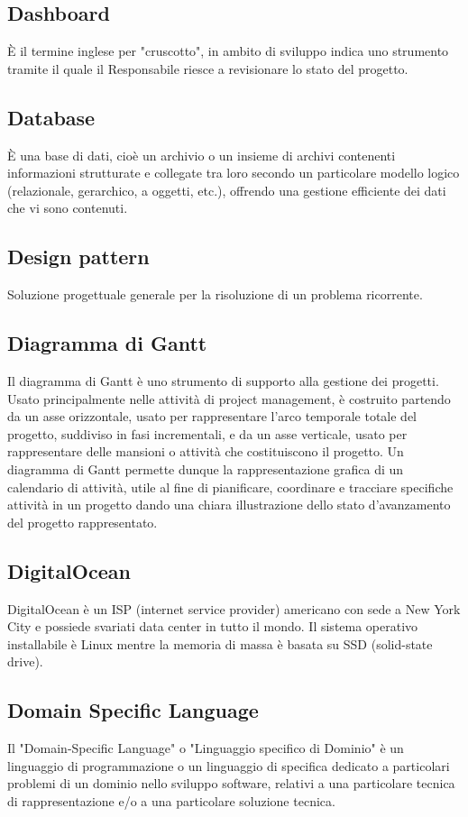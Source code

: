 \subsection*{Dashboard}
È il termine inglese per "cruscotto", in ambito di sviluppo indica uno strumento
tramite il quale il Responsabile riesce a revisionare lo stato del progetto.

\subsection*{Database}
È una base di dati, cioè un archivio o un insieme di archivi contenenti informazioni
strutturate e collegate tra loro secondo un particolare modello logico (relazionale, gerarchico,
a oggetti, etc.), offrendo una gestione efficiente dei dati che vi sono contenuti.

\subsection*{Design pattern}
Soluzione progettuale generale per la risoluzione di un problema ricorrente.

\subsection*{Diagramma di Gantt}
Il diagramma di Gantt è uno strumento di supporto alla gestione dei
progetti. Usato principalmente nelle attività di project management, è costruito partendo da
un asse orizzontale, usato per rappresentare l’arco temporale totale del progetto, suddiviso
in fasi incrementali, e da un asse verticale, usato per rappresentare delle mansioni o attività
che costituiscono il progetto. Un diagramma di Gantt permette dunque la rappresentazione
grafica di un calendario di attività, utile al fine di pianificare, coordinare e tracciare specifiche
attività in un progetto dando una chiara illustrazione dello stato d’avanzamento del progetto
rappresentato.

\subsection*{DigitalOcean}
DigitalOcean è un ISP (internet service provider) americano con sede a New York City e possiede svariati data center in tutto il mondo. Il sistema operativo installabile è Linux mentre la memoria di massa è basata su SSD (solid-state drive).

\subsection*{Domain Specific Language}
Il "Domain-Specific Language" o "Linguaggio specifico di Dominio" è un linguaggio
di programmazione o un linguaggio di specifica dedicato a particolari
problemi di un dominio nello sviluppo software, relativi a una particolare tecnica
di rappresentazione e/o a una particolare soluzione tecnica.

